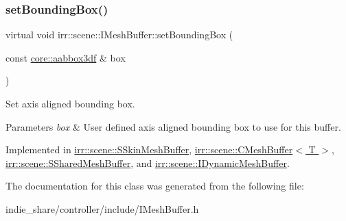 \mbox{\label{classirr_1_1scene_1_1IMeshBuffer_adbbfb7757dfbba7357193d2280893df6}} 
\subsubsection{\texorpdfstring{set\+Bounding\+Box()}{setBoundingBox()}}
{\footnotesize\ttfamily virtual void irr\+::scene\+::\+I\+Mesh\+Buffer\+::set\+Bounding\+Box (\begin{DoxyParamCaption}\item[{const \hyperlink{namespaceirr_1_1core_adfc8fa01b30044c55f3332a1d6c1aa19}{core\+::aabbox3df} \&}]{box }\end{DoxyParamCaption})\hspace{0.3cm}{\ttfamily [pure virtual]}}



Set axis aligned bounding box. 


\begin{DoxyParams}{Parameters}
{\em box} & User defined axis aligned bounding box to use for this buffer. \\
\hline
\end{DoxyParams}


Implemented in \hyperlink{structirr_1_1scene_1_1SSkinMeshBuffer_ab4d3b6c78a4a3cfe368af4c89350497f}{irr\+::scene\+::\+S\+Skin\+Mesh\+Buffer}, \hyperlink{classirr_1_1scene_1_1CMeshBuffer_ab5a21d48a5af73f1ef880a48c3798a67}{irr\+::scene\+::\+C\+Mesh\+Buffer$<$ T $>$}, \hyperlink{structirr_1_1scene_1_1SSharedMeshBuffer_a54e11fd284245c3f5e5e07145ad4a202}{irr\+::scene\+::\+S\+Shared\+Mesh\+Buffer}, and \hyperlink{classirr_1_1scene_1_1IDynamicMeshBuffer_adbe127e3774de6ae7ce96cb534a336e5}{irr\+::scene\+::\+I\+Dynamic\+Mesh\+Buffer}.



The documentation for this class was generated from the following file\+:\begin{DoxyCompactItemize}
\item 
indie\+\_\+share/controller/include/I\+Mesh\+Buffer.\+h\end{DoxyCompactItemize}
